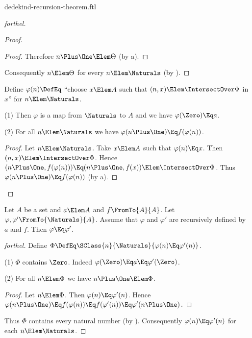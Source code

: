 \documentclass{stex}
\begin{document}
\begin{smodule}{dedekind-recursion-theorem.ftl}
\begin{proof}[forthel]
\begin{proof}
\begin{proof}
      Therefore $n \Plus \One \Elem \Theta$ (by a).
    \end{proof}

    Consequently $n \Elem \Theta$ for every $n \Elem \Naturals$ (by ).
  \end{proof}

  Define $\varphi(n) \DefEq$ ``choose $x \Elem A$ such that $(n, x) \Elem
  \IntersectOver \Phi$ in $x$'' for $n \Elem \Naturals$.

  (1) Then $\varphi$ is a map from $\Naturals$ to $A$ and we have
  $\varphi(\Zero) \Eq a$.

  (2) For all $n \Elem \Naturals$ we have $\varphi(n \Plus \One) \Eq
  f(\varphi(n))$.
  \begin{proof}
    Let $n \Elem \Naturals$.
    Take $x \Elem A$ such that $\varphi(n) \Eq x$.
    Then $(n, x) \Elem \IntersectOver \Phi$.
    Hence $(n \Plus \One, f(\varphi(n))) \Eq (n \Plus \One, f(x)) \Elem \IntersectOver \Phi$.
    Thus $\varphi(n \Plus \One) \Eq f(\varphi(n))$ (by a).
  \end{proof}
\end{proof}

\begin{theorem*}[forthel,title=Dedekind's Recursion Theorem: Uniqueness,name=Dedekind Recursion Uniqueness]
  Let $A$ be a set and $a \Elem A$ and $f \FromTo{A}{A}$.
  Let $\varphi, \varphi' \FromTo{\Naturals}{A}$.
  Assume that $\varphi$ and $\varphi'$ are recursively defined by $a$ and
  $f$.
  Then $\varphi \Eq \varphi'$.
\end{theorem*}
\begin{proof}[forthel]
  Define $\Phi \DefEq \SClass{n}{\Naturals}{\varphi(n) \Eq \varphi'(n)}$.

  (1) $\Phi$ contains $\Zero$.
  Indeed $\varphi(\Zero) \Eq a \Eq \varphi'(\Zero)$.

  (2) For all $n \Elem \Phi$ we have $n \Plus \One \Elem \Phi$.
  \begin{proof}
    Let $n \Elem \Phi$.
    Then $\varphi(n) \Eq \varphi'(n)$.
    Hence $\varphi(n \Plus \One)
      \Eq f(\varphi(n))
      \Eq f(\varphi'(n))
      \Eq \varphi'(n \Plus \One)$.
    \end{proof}

  Thus $\Phi$ contains every natural number (by ).
  Consequently $\varphi(n) \Eq \varphi'(n)$ for each $n \Elem \Naturals$.
\end{proof}

\end{smodule}
\end{document}
